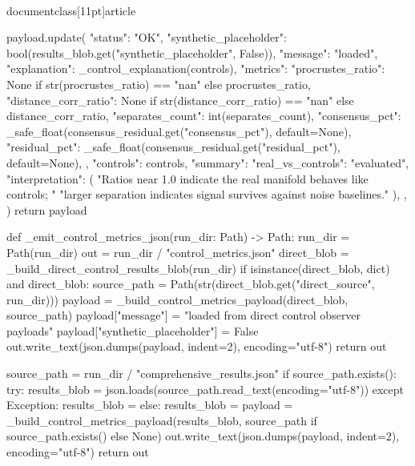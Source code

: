 \\documentclass[11pt]{article}
\begin{document}
\begin{CodeBlock}
    payload.update(
        {
            "status": "OK",
            "synthetic_placeholder": bool(results_blob.get("synthetic_placeholder", False)),
            "message": "loaded",
            "explanation": _control_explanation(controls),
            "metrics": {
                "procrustes_ratio": None if str(procrustes_ratio) == "nan" else procrustes_ratio,
                "distance_corr_ratio": None if str(distance_corr_ratio) == "nan" else distance_corr_ratio,
                "separates_count": int(separates_count),
                "consensus_pct": _safe_float(consensus_residual.get("consensus_pct"), default=None),
                "residual_pct": _safe_float(consensus_residual.get("residual_pct"), default=None),
            },
            "controls": controls,
            "summary": {
                "real_vs_controls": "evaluated",
                "interpretation": (
                    "Ratios near 1.0 indicate the real manifold behaves like controls; "
                    "larger separation indicates signal survives against noise baselines."
                ),
            },
        }
    )
    return payload


def _emit_control_metrics_json(run_dir: Path) -> Path:
    run_dir = Path(run_dir)
    out = run_dir / "control_metrics.json"
    direct_blob = _build_direct_control_results_blob(run_dir)
    if isinstance(direct_blob, dict) and direct_blob:
        source_path = Path(str(direct_blob.get("direct_source", run_dir)))
        payload = _build_control_metrics_payload(direct_blob, source_path)
        payload["message"] = "loaded from direct control observer payloads"
        payload["synthetic_placeholder"] = False
        out.write_text(json.dumps(payload, indent=2), encoding="utf-8")
        return out

    source_path = run_dir / "comprehensive_results.json"
    if source_path.exists():
        try:
            results_blob = json.loads(source_path.read_text(encoding="utf-8"))
        except Exception:
            results_blob = {}
    else:
        results_blob = {}
    payload = _build_control_metrics_payload(results_blob, source_path if source_path.exists() else None)
    out.write_text(json.dumps(payload, indent=2), encoding="utf-8")
    return out



\end{CodeBlock}
\end{document}
